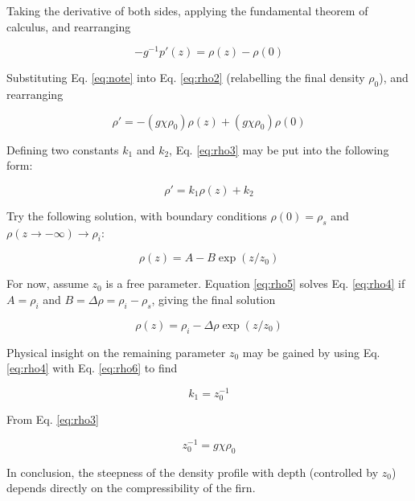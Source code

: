\documentclass[12pt]{article}
\begin{document}
Taking the derivative of both sides, applying the fundamental theorem of calculus, and rearranging

\begin{equation}
-g^{-1} p'(z) = \rho(z) - \rho(0)
\label{eq:rho2}
\end{equation}

Substituting Eq. \ref{eq:note} into Eq. \ref{eq:rho2} (relabelling the final density $\rho_0$), and rearranging

\begin{equation}
\rho' = -\left(g \chi \rho_{0}\right)\rho(z) + \left(g \chi \rho_{0}\right)\rho(0)
\label{eq:rho3}
\end{equation}

Defining two constants $k_1$ and $k_2$, Eq. \ref{eq:rho3} may be put into the following form:

\begin{equation}
\rho' = k_1 \rho(z) + k_2
\label{eq:rho4}
\end{equation}

Try the following solution, with boundary conditions $\rho(0) = \rho_s$ and $\rho(z\to-\infty) \to \rho_i$:

\begin{equation}
\rho(z) = A - B \exp(z/z_0)
\label{eq:rho5}
\end{equation}

For now, assume $z_0$ is a free parameter.  Equation \ref{eq:rho5} solves Eq. \ref{eq:rho4} if $A = \rho_i$ and $B = \Delta \rho = \rho_i - \rho_s$, giving the final solution

\begin{equation}
\boxed{\rho(z) = \rho_i - \Delta \rho \exp(z/z_0)}
\label{eq:rho6}
\end{equation}

Physical insight on the remaining parameter $z_0$ may be gained by using Eq. \ref{eq:rho4} with Eq. \ref{eq:rho6} to find

\begin{equation}
k_1 = z_0^{-1} \label{eq:insight1}
\end{equation}

From Eq. \ref{eq:rho3}

\begin{equation}
\boxed{z_0^{-1} =  g\chi\rho_0} \label{eq:insight2}
\end{equation}

In conclusion, the steepness of the density profile with depth (controlled by $z_0$) depends directly on the compressibility of the firn.
\end{document}

